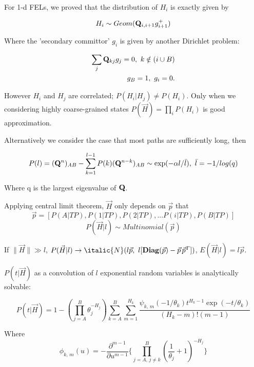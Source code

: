 \documentclass[11pt, a4paper]{article}
\begin{document}
For 1-d FELs, we proved that the distribution of $H_i$ is exactly given by

\begin{equation}
  H_i \sim Geom(\bold{Q}_{i,i+1} g_{i+1}^+)
\end{equation}

Where the 'secondary committor' $g_i$ is given by another Dirichlet problem:

\begin{equation}
  \begin{split}
    \sum_j \bold{Q}_{kj} g_j =0, \ k \notin (i\cup B)\\
    g_B =1, \ g_i =0.
  \end{split}
\end{equation}

However $H_i$ and $H_j$ are correlated; $P(H_i|H_j)\neq P(H_i)$. Only when we considering highly coarse-grained states
 $P(\vec{H})=\prod_i P(H_i)$ is good approximation.

Alternatively we consider the case that most paths are sufficiently long, then

\begin{equation}
  P(l)=(\bold{Q}^n)_{AB}-\sum_{k=1}^{l-1} P(k) (\bold{Q}^{n-k})_{AB} \sim \exp(-\alpha l/ \bar{l}),\ \bar{l}=-1/log(q)
\end{equation}

Where q is the largest eigenvalue of $\bold{Q}$.

Applying central limit theorem, $\vec{H}$ only depends on $\vec{p}$ that
 \[\vec{p}=[P(A|TP), P(1|TP), P(2|TP), ...P(i|TP), P(B|TP)]\]
\begin{equation}
  P(\vec{H}|l)\sim Multinomial(\vec{p})
\end{equation}

If $\| \vec{H} \| \gg l$, $P(\vec{H}|l)\rightarrow \italic{N}(l\vec{p},\ l [\bold{Diag}(\vec{p})-\vec{p}\,\vec{p}^T])$, $E(\vec{H}|l)=l\vec{p}$.

$P(t|\vec{H})$ as a convolution of $l$ exponential random variables is analytically solvable:

\begin{equation}
  P(t|\vec{H})=1-(\prod_{j=A}^{B} \theta_{j}^{-H_j})\sum_{k=A}^{B}\sum_{m=1}^{H_k} \frac{\psi_{k,\,m}(-1/\theta_k)t^{H_k-1}\exp(-t/\theta_k)}{(H_k-m)! (m-1)}
\end{equation}

Where
\begin{equation}
  \phi_{k,\,m}(u)=-\frac{\partial^{m-1}}{\partial u^{m-1}}\{ \prod_{j=A,\, j\neq k}^{B} (\frac{1}{\theta_j}+1)^{-H_j}\}
\end{equation}
\end{document}
